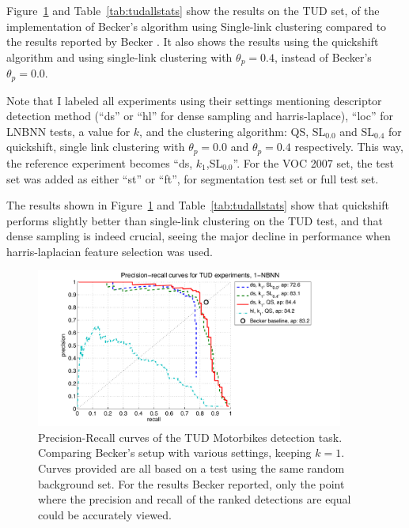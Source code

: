 Figure~\ref{fig:tudk1prc} and Table~\ref{tab:tudallstats} show the results on the TUD set, of the implementation of Becker's algorithm using Single-link clustering compared to the results reported by Becker \cite{becker2012codebook}. It also shows the results using the quickshift algorithm and using single-link clustering with $\theta_p = 0.4$, instead of Becker's $\theta_p = 0.0$. 

Note that I labeled all experiments using their settings mentioning descriptor detection method (``ds'' or ``hl'' for dense sampling and harris-laplace), ``loc'' for LNBNN tests, a value for $k$, and the clustering algorithm: QS, SL$_{0.0}$ and SL$_{0.4}$ for quickshift, single link clustering with $\theta_p=0.0$ and $\theta_p=0.4$ respectively. This way, the reference experiment becomes ``ds, $k_1$,SL$_{0.0}$''. For the VOC 2007 set, the test set was added as either ``st'' or ``ft'', for segmentation test set or full test set.

The results shown in Figure~\ref{fig:tudk1prc} and Table~\ref{tab:tudallstats} show that quickshift performs slightly better than single-link clustering on the TUD test, and that dense sampling is indeed crucial, seeing the major decline in performance when harris-laplacian feature selection was used.

\begin{figure}[hbt]
    \centering
    \includegraphics[width=0.9\textwidth]{TUDk1prc}
    \caption{Precision-Recall curves of the TUD Motorbikes detection task. Comparing Becker's \cite{becker2012codebook} setup with various settings, keeping $k=1$. Curves provided are all based on a test using the same random background set. For the results Becker reported, only the point where the precision and recall of the ranked detections are equal could be accurately viewed.}
    \label{fig:tudk1prc}
\end{figure}

